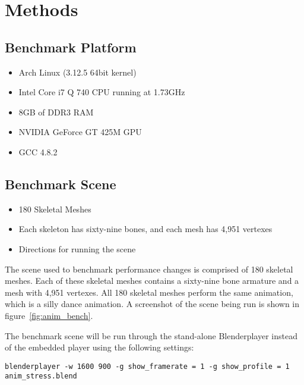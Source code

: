 \section{Methods}

\subsection{Benchmark Platform}
\begin{itemize}
 \item Arch Linux (3.12.5 64bit kernel)
 \item Intel Core i7 Q 740 CPU running at 1.73GHz
 \item 8GB of DDR3 RAM
 \item NVIDIA GeForce GT 425M GPU
 \item GCC 4.8.2
\end{itemize}

\subsection{Benchmark Scene}
\begin{itemize}
 \item 180 Skeletal Meshes
 \item Each skeleton has sixty-nine bones, and each mesh has 4,951 vertexes
 \item Directions for running the scene
\end{itemize}

The scene used to benchmark performance changes is comprised of 180 skeletal meshes. Each of these skeletal meshes contains a sixty-nine bone armature and a mesh with 4,951 vertexes. All 180 skeletal meshes perform the same animation, which is a silly dance animation. A screenshot of the scene being run is shown in figure~\ref{fig:anim_bench}.


The benchmark scene will be run through the stand-alone Blenderplayer instead of the embedded player using the following settings:
\begin{verbatim}
blenderplayer -w 1600 900 -g show_framerate = 1 -g show_profile = 1 anim_stress.blend
\end{verbatim}


